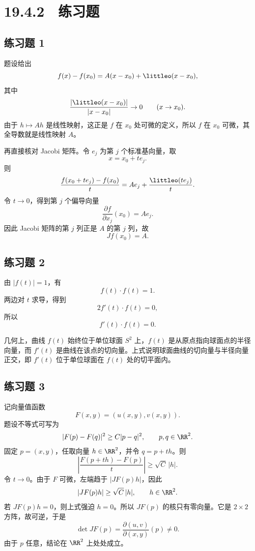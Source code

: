 \section*{19.4.2　练习题}

\subsection*{练习题 1}
\begin{xsolution}
题设给出
\[
  f(x)-f(x_0)=A(x-x_0)+\littleo(x-x_0),
\]
其中
\[
  \frac{|\littleo(x-x_0)|}{|x-x_0|}\to0
  \qquad(x\to x_0).
\]
由于 $h\mapsto Ah$ 是线性映射，这正是 $f$ 在 $x_0$ 处可微的定义，所以 $f$ 在 $x_0$ 可微，其全导数就是线性映射 $A$。

再直接核对 Jacobi 矩阵。令 $e_j$ 为第 $j$ 个标准基向量，取
\[
  x=x_0+t e_j.
\]
则
\[
  \frac{f(x_0+t e_j)-f(x_0)}t
  =Ae_j+\frac{\littleo(t e_j)}t.
\]
令 $t\to0$，得到第 $j$ 个偏导向量
\[
  \frac{\partial f}{\partial x_j}(x_0)=Ae_j.
\]
因此 Jacobi 矩阵的第 $j$ 列正是 $A$ 的第 $j$ 列，故
\[
  \boxed{Jf(x_0)=A}.
\]
\end{xsolution}

\subsection*{练习题 2}
\begin{xsolution}
由 $|f(t)|=1$，有
\[
  f(t)\cdot f(t)=1.
\]
两边对 $t$ 求导，得到
\[
  2f'(t)\cdot f(t)=0,
\]
所以
\[
  \boxed{f'(t)\cdot f(t)=0}.
\]

几何上，曲线 $f(t)$ 始终位于单位球面 $S^2$ 上，$f(t)$ 是从原点指向球面点的半径向量，而 $f'(t)$ 是曲线在该点的切向量。上式说明球面曲线的切向量与半径向量正交，即 $f'(t)$ 位于单位球面在 $f(t)$ 处的切平面内。
\end{xsolution}

\subsection*{练习题 3}
\begin{xsolution}
记向量值函数
\[
  F(x,y)=(u(x,y),v(x,y)).
\]
题设不等式可写为
\[
  |F(p)-F(q)|^2\ge C|p-q|^2,
  \qquad p,q\in\RR^2.
\]
固定 $p=(x,y)$，任取向量 $h\in\RR^2$，并令 $q=p+th$。则
\[
  \left|\frac{F(p+th)-F(p)}t\right|
  \ge\sqrt C\,|h|.
\]
令 $t\to0$。由于 $F$ 可微，左端趋于 $|JF(p)h|$，因此
\[
  |JF(p)h|\ge\sqrt C\,|h|,
  \qquad h\in\RR^2.
\]
若 $JF(p)h=0$，则上式强迫 $h=0$。所以 $JF(p)$ 的核只有零向量。它是 $2\times2$ 方阵，故可逆，于是
\[
  \boxed{\det JF(p)
  =\frac{\partial(u,v)}{\partial(x,y)}(p)\ne0}.
\]
由于 $p$ 任意，结论在 $\RR^2$ 上处处成立。
\end{xsolution}

